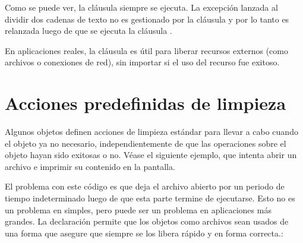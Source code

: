 \documentclass[a4,10pt,spanish]{sphinxmanual}
\begin{document}
\sphinxAtStartPar
Como se puede ver, la cláusula  siempre se ejecuta.  La excepción  lanzada al dividir dos cadenas de texto no es gestionado por la cláusula  y por lo tanto es relanzada luego de que se ejecuta la cláusula .

\sphinxAtStartPar
En aplicaciones reales, la cláusula  es útil para liberar recursos externos (como archivos o conexiones de red), sin importar si el uso del recurso fue exitoso.


\section{Acciones predefinidas de limpieza}
\label{\detokenize{tutorial/errors:predefined-clean-up-actions}}\label{\detokenize{tutorial/errors:tut-cleanup-with}}
\sphinxAtStartPar
Algunos objetos definen acciones de limpieza estándar para llevar a cabo cuando el objeto ya no necesario, independientemente de que las operaciones sobre el objeto hayan sido exitosas o no. Véase el siguiente ejemplo, que intenta abrir un archivo e imprimir su contenido en la pantalla.

\begin{sphinxVerbatim}[commandchars=\\\{\}]
   
     
\end{sphinxVerbatim}

\sphinxAtStartPar
El problema con este código es que deja el archivo abierto por un periodo de tiempo indeterminado luego de que esta parte termine de ejecutarse.  Esto no es un problema en  simples, pero puede ser un problema en aplicaciones más grandes.  La declaración  permite que los objetos como archivos sean usados de una forma que asegure que siempre se los libera rápido y en forma correcta.:

\begin{sphinxVerbatim}[commandchars=\\\{\}]
   
       
         
\end{sphinxVerbatim}
\end{document}
